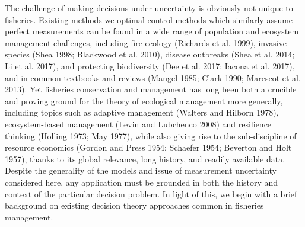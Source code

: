 \documentclass[3p]{elsarticle} %
\begin{document}
The challenge of making decisions under uncertainty is obviously not
unique to fisheries. Existing methods we optimal control methods which
similarly assume perfect measurements can be found in a wide range of
population and ecosystem management challenges, including fire ecology
(Richards et al. 1999), invasive species (Shea 1998; Blackwood et al.
2010), disease outbreaks (Shea et al. 2014; Li et al. 2017), and
protecting biodiversity (Dee et al. 2017; Iacona et al. 2017), and in
common textbooks and reviews (Mangel 1985; Clark 1990; Marescot et al.
2013). Yet fisheries conservation and management has long been both a
crucible and proving ground for the theory of ecological management more
generally, including topics such as adaptive management (Walters and
Hilborn 1978), ecosystem-based management (Levin and Lubchenco 2008) and
resilience thinking (Holling 1973; May 1977), while also giving rise to
the sub-discipline of resource economics (Gordon and Press 1954;
Schaefer 1954; Beverton and Holt 1957), thanks to its global relevance,
long history, and readily available data. Despite the generality of the
models and issue of measurement uncertainty considered here, any
application must be grounded in both the history and context of the
particular decision problem. In light of this, we begin with a brief
background on existing decision theory approaches common in fisheries
management.
\end{document}
